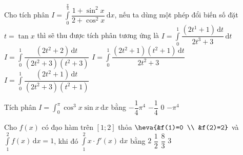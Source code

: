 \begin{ex}%
Cho tích phân $I=\displaystyle\int\limits_0^{\frac{\pi}{4}} \dfrac{1+\sin^2x}{2+\cos^2x} \mathrm{\,d}x$, nếu ta dùng một phép đổi biến số đặt $t=\tan x$ thì sẽ thu được tích phân tương ứng là
\choice
{$I=\displaystyle\int\limits_0^1 \dfrac{(2t^1+1)\mathrm{\,d}t}{2t^3+3}\mathrm{\,d}t$}
{$I=\displaystyle\int\limits_0^1 \dfrac{(2t^2+2)\mathrm{\,d}t}{(2t^2+3)(t^2+3)}$}
{$I=\displaystyle\int\limits_0^1 \dfrac{(2t^2+1)(t^2+1)\mathrm{\,d}t}{2t^2+3}$}
{\True $I=\displaystyle\int\limits_0^1 \dfrac{(2t^2+1)\mathrm{\,d}t}{(2t^2+3)(t^2+1)}$}
\end{ex}

\begin{ex}%
Tích phân $I=\displaystyle\int_0^\pi\cos ^3 x\sin x \mathrm{\,d}x$ bằng
\choice
{$-\dfrac{1}{4}\pi^4$}
{$-\dfrac{1}{4}$}
{\True $0$}
{$-\pi^4$}
\end{ex}

\begin{ex}%
Cho $f(x)$ có đạo hàm trên $[1; 2]$ thỏa $\heva{&f(1)=0 \\ &f(2)=2}$ và $\displaystyle\int\limits_1^2 f(x)\mathrm{\,d}x=1$,  khi đó $\displaystyle\int\limits_1^2 x\cdot f'(x)\mathrm{\,d}x $ bằng
\choice
{$2$}
{$\dfrac{1}{2}$}
{$\dfrac{8}{3}$}
{\True $3$}
\end{ex}

